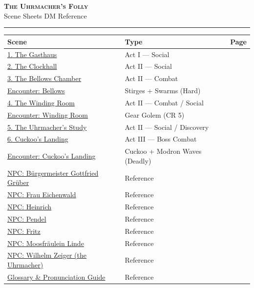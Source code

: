 \documentclass[10pt,letterpaper]{article}
\begin{document}

\thispagestyle{empty}
\begin{center}
{\LARGE\bfseries\scshape\textcolor{accent}{The Uhrmacher's Folly}}\\[2pt]
{\small Scene Sheets \quad \textbullet \quad DM Reference}\\[2pt]
\textcolor{rulecol}{\rule{0.5\textwidth}{0.8pt}}
\end{center}
\vspace{8pt}

\renewcommand{\arraystretch}{1.4}
\begin{tabularx}{\textwidth}{@{}lXr@{}}
\toprule
\textbf{Scene} & \textbf{Type} & \textbf{Page} \\
\midrule
\hyperref[sec:gasthaus]{1. The Gasthaus} & Act I --- Social & \pageref{sec:gasthaus} \\
\hyperref[sec:clockhall]{2. The Clockhall} & Act II --- Social & \pageref{sec:clockhall} \\
\hyperref[sec:bellows]{3. The Bellows Chamber} & Act II --- Combat & \pageref{sec:bellows} \\
\hyperref[sec:enc-bellows]{\quad Encounter: Bellows} & Stirges + Swarms (Hard) & \pageref{sec:enc-bellows} \\
\hyperref[sec:gearroom]{4. The Winding Room} & Act II --- Combat / Social & \pageref{sec:gearroom} \\
\hyperref[sec:enc-gearroom]{\quad Encounter: Winding Room} & Gear Golem (CR 5) & \pageref{sec:enc-gearroom} \\
\hyperref[sec:study]{5. The Uhrmacher's Study} & Act II --- Social / Discovery & \pageref{sec:study} \\
\hyperref[sec:cuckoo]{6. Cuckoo's Landing} & Act III --- Boss Combat & \pageref{sec:cuckoo} \\
\hyperref[sec:enc-cuckoo]{\quad Encounter: Cuckoo's Landing} & Cuckoo + Modron Waves (Deadly) & \pageref{sec:enc-cuckoo} \\
\midrule
\hyperref[sec:npc-gruber]{NPC: Bürgermeister Gottfried Grüber} & Reference & \pageref{sec:npc-gruber} \\
\hyperref[sec:npc-eichenwald]{NPC: Frau Eichenwald} & Reference & \pageref{sec:npc-eichenwald} \\
\hyperref[sec:npc-heinrich]{NPC: Heinrich} & Reference & \pageref{sec:npc-heinrich} \\
\hyperref[sec:npc-pendel]{NPC: Pendel} & Reference & \pageref{sec:npc-pendel} \\
\hyperref[sec:npc-fritz]{NPC: Fritz} & Reference & \pageref{sec:npc-fritz} \\
\hyperref[sec:npc-linde]{NPC: Moosfräulein Linde} & Reference & \pageref{sec:npc-linde} \\
\hyperref[sec:npc-zeiger]{NPC: Wilhelm Zeiger (the Uhrmacher)} & Reference & \pageref{sec:npc-zeiger} \\
\midrule
\hyperref[sec:glossary]{Glossary \& Pronunciation Guide} & Reference & \pageref{sec:glossary} \\
\bottomrule
\end{tabularx}
\renewcommand{\arraystretch}{1.0}
\end{document}

